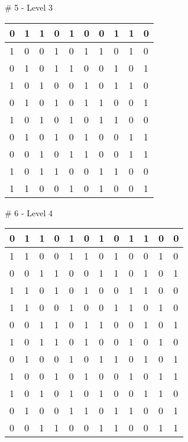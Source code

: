 \smallskip

\# 5 - Level 3 \newline
\begin{tabular}{|m{\collen}|m{\collen}|m{\collen}|m{\collen}|m{\collen}|m{\collen}|m{\collen}|m{\collen}|m{\collen}|m{\collen}|}
\hline
  0 & 1 & 1 & 0 & 1 & 0 & 0 & 1 & 1 & 0 \\
\hline
  1 & 0 & 0 & 1 & 0 & 1 & 1 & 0 & 1 & 0 \\
\hline
  0 & 1 & 0 & 1 & 1 & 0 & 0 & 1 & 0 & 1 \\
\hline
  1 & 0 & 1 & 0 & 0 & 1 & 0 & 1 & 1 & 0 \\
\hline
  0 & 1 & 0 & 1 & 0 & 1 & 1 & 0 & 0 & 1 \\
\hline
  1 & 0 & 1 & 0 & 1 & 0 & 1 & 1 & 0 & 0 \\
\hline
  0 & 1 & 0 & 1 & 0 & 1 & 0 & 0 & 1 & 1 \\
\hline
  0 & 0 & 1 & 0 & 1 & 1 & 0 & 0 & 1 & 1 \\
\hline
  1 & 0 & 1 & 1 & 0 & 0 & 1 & 1 & 0 & 0 \\
\hline
  1 & 1 & 0 & 0 & 1 & 0 & 1 & 0 & 0 & 1 \\
\hline
\end{tabular}


\smallskip

\# 6 - Level 4 \newline
\begin{tabular}{|m{\collen}|m{\collen}|m{\collen}|m{\collen}|m{\collen}|m{\collen}|m{\collen}|m{\collen}|m{\collen}|m{\collen}|m{\collen}|m{\collen}|}
\hline
  0 & 1 & 1 & 0 & 1 & 0 & 1 & 0 & 1 & 1 & 0 & 0 \\
\hline
  1 & 1 & 0 & 0 & 1 & 1 & 0 & 1 & 0 & 0 & 1 & 0 \\
\hline
  0 & 0 & 1 & 1 & 0 & 0 & 1 & 1 & 0 & 1 & 0 & 1 \\
\hline
  1 & 1 & 0 & 1 & 0 & 1 & 0 & 0 & 1 & 1 & 0 & 0 \\
\hline
  1 & 1 & 0 & 0 & 1 & 0 & 0 & 1 & 1 & 0 & 1 & 0 \\
\hline
  0 & 0 & 1 & 1 & 0 & 1 & 1 & 0 & 0 & 1 & 0 & 1 \\
\hline
  1 & 0 & 1 & 1 & 0 & 1 & 0 & 0 & 1 & 0 & 1 & 0 \\
\hline
  0 & 1 & 0 & 0 & 1 & 0 & 1 & 1 & 0 & 1 & 0 & 1 \\
\hline
  1 & 0 & 0 & 1 & 0 & 1 & 0 & 0 & 1 & 0 & 1 & 1 \\
\hline
  1 & 0 & 1 & 0 & 1 & 0 & 1 & 0 & 0 & 1 & 1 & 0 \\
\hline
  0 & 1 & 0 & 0 & 1 & 1 & 0 & 1 & 1 & 0 & 0 & 1 \\
\hline
  0 & 0 & 1 & 1 & 0 & 0 & 1 & 1 & 0 & 0 & 1 & 1 \\
\hline
\end{tabular}


